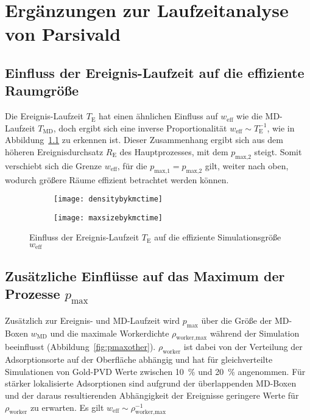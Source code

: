 \chapter{Ergänzungen zur Laufzeitanalyse von Parsivald}
\label{appendix_runtime}

\section{Einfluss der Ereignis-Laufzeit auf die effiziente Raumgröße}

Die Ereignis-Laufzeit $T_\text{E}$ hat einen ähnlichen Einfluss auf $w_\text{eff}$ wie die MD-Laufzeit $T_\text{MD}$, doch ergibt sich eine inverse Proportionalität $w_\text{eff} \sim T_\text{E}^{-1}$, wie in Abbildung~\ref{fig:weffeventtime} zu erkennen ist.
Dieser Zusammenhang ergibt sich aus dem höheren Ereignisdurchsatz $R_\text{E}$ des Hauptprozesses, mit dem $p_\text{max,2}$ steigt.
Somit verschiebt sich die Grenze $w_\text{eff}$, für die $p_\text{max,1} = p_\text{max,2}$ gilt, weiter nach oben, wodurch größere Räume effizient betrachtet werden können.

\begin{figure}[p]

  \captionsetup[subfigure]{singlelinecheck=false}
  \def\subfigwidth{7cm}
  \begin{subfigure}[t]{\subfigwidth}
    \texttt{[image: densitybykmctime]}
  \end{subfigure}
  \hfill
  \begin{subfigure}[t]{\subfigwidth}
    \texttt{[image: maxsizebykmctime]}
  \end{subfigure}

  \caption{Einfluss der Ereignis-Laufzeit $T_\text{E}$ auf die effiziente Simulationsgröße $w_\text{eff}$}
  \label{fig:weffeventtime}

\end{figure}

\section{Zusätzliche Einflüsse auf das Maximum der Prozesse \texorpdfstring{$p_\text{max}$}{pmax}}

Zusätzlich zur Ereignis- und MD-Laufzeit wird $p_\text{max}$ über die Größe der MD-Boxen $w_\text{MD}$ und die maximale Workerdichte $\rho_\text{worker,max}$ während der Simulation beeinflusst (Abbildung~\ref{fig:pmaxother}).
$\rho_\text{worker}$ ist dabei von der Verteilung der Adsorptionsorte auf der Oberfläche abhängig und hat für gleichverteilte Simulationen von Gold-PVD Werte zwischen \SI{10}{\percent} und \SI{20}{\percent} angenommen.
Für stärker lokalisierte Adsorptionen sind aufgrund der überlappenden MD-Boxen und der daraus resultierenden Abhängigkeit der Ereignisse geringere Werte für $\rho_\text{worker}$ zu erwarten.
Es gilt $w_\text{eff} \sim \rho_\text{worker,max}^{-1}$

